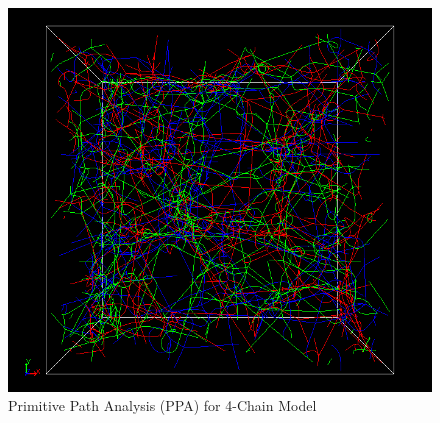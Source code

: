 \documentclass[uplatex,dvipdfmx,a4paper,11pt]{jsarticle}
\begin{document}
\begin{figure}[hb]
\begin{minipage}{0.34\hsize}
\begin{center}
	\end{center}
\end{minipage}
\begin{minipage}{0.32\hsize}
	\begin{center}
		\includegraphics[width=.8\textwidth]{N48_f4_PPA.png}
        \caption{Primitive Path Analysis (PPA) for 4-Chain Model}
        \label{fig:ppa}
	\end{center}
\end{minipage}
\end{figure}

\vspace{-3mm}



\end{document}

